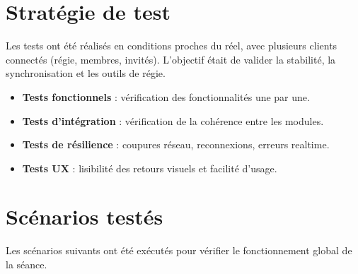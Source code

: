 \documentclass[11pt,a4paper]{report}
\begin{document}
\section{Stratégie de test}
Les tests ont été réalisés en conditions proches du réel, avec plusieurs clients connectés (régie, membres, invités). L'objectif était de valider la stabilité, la synchronisation et les outils de régie.
\begin{itemize}
    \item \textbf{Tests fonctionnels} : vérification des fonctionnalités une par une.
    \item \textbf{Tests d'intégration} : vérification de la cohérence entre les modules.
    \item \textbf{Tests de résilience} : coupures réseau, reconnexions, erreurs realtime.
    \item \textbf{Tests UX} : lisibilité des retours visuels et facilité d'usage.
\end{itemize}

\section{Scénarios testés}
Les scénarios suivants ont été exécutés pour vérifier le fonctionnement global de la séance.
\end{document}
